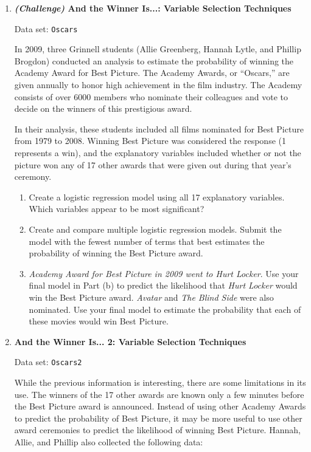 \documentclass[
]{report}
\begin{document}
\begin{enumerate}
  \item \textbf{\textit{(Challenge)} And the Winner Is...: Variable Selection Techniques}

Data set: \texttt{Oscars}

In 2009, three Grinnell students (Allie Greenberg, Hannah Lytle, and Phillip Brogdon) conducted an analysis to estimate the probability of winning the Academy Award for Best Picture. The Academy Awards, or “Oscars,” are given annually to honor high achievement in the film industry. The Academy consists of over 6000 members who nominate their colleagues and vote to decide on the winners of this prestigious award.

In their analysis, these students included all films nominated for Best Picture from 1979 to 2008. Winning Best Picture was considered the response (1 represents a win), and the explanatory variables included whether or not the picture won any of 17 other awards that were given out during that year’s ceremony.

  \begin{enumerate}
    \item Create a logistic regression model using all 17 explanatory variables. Which variables appear to be most significant?
    \item Create and compare multiple logistic regression models. Submit the model with the fewest number of terms that best estimates the probability of winning the Best Picture award.
    \item \textit{Academy Award for Best Picture in 2009 went to \textit{Hurt Locker}}. Use your final model in Part (b) to predict the likelihood that \textit{Hurt Locker} would win the Best Picture award. \textit{Avatar} and \textit{The Blind Side} were also nominated. Use your final model to estimate the probability that each of these movies would win Best Picture.
  \end{enumerate}

  \item \textbf{And the Winner Is... 2: Variable Selection Techniques}

Data set: \texttt{Oscars2}

While the previous information is interesting, there are some limitations in its use. The winners of the 17 other awards are known only a few minutes before the Best Picture award is announced. Instead of using other Academy Awards to predict the probability of Best Picture, it may be more useful to use other award ceremonies to predict the likelihood of winning Best Picture. Hannah, Allie, and Phillip also collected the following data:


\end{enumerate}
\end{document}
